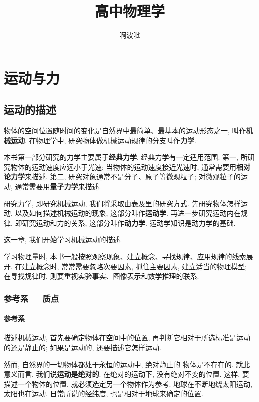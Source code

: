 \documentclass[11pt,a4paper]{ctexbook}
\title{高中物理学}
\author{啊波呲}
\newcommand{\bre}{\ \ \ }
\newcommand{\setdisplaywhitespace}{%
  \setlength{\abovedisplayskip}{4pt plus 2pt minus 1pt}%
  \setlength{\belowdisplayskip}{4pt plus 2pt minus 1pt}%
  \setlength{\abovedisplayshortskip}{2pt plus 1pt minus 1pt}%
  \setlength{\belowdisplayshortskip}{3pt plus 1pt minus 1pt}%
  \setlength{\jot}{3pt}%
}
\begin{document}
\setdisplaywhitespace
\maketitle
{}
\tableofcontents

\setdisplaywhitespace

\part{运动与力}

\chapter{运动的描述}
物体的空间位置随时间的变化是自然界中最简单、最基本的运动形态之一, 叫作\textbf{机械运动}.
在物理学中, 研究物体做机械运动规律的分支叫作\textbf{力学}.

本书第一部分研究的力学主要属于\textbf{经典力学}. 经典力学有一定适用范围.
第一, 所研究物体的运动速度应远小于光速; 当物体的运动速度接近光速时, 通常需要用\textbf{相对论力学}来描述.
第二, 研究对象通常不是分子、原子等微观粒子; 对微观粒子的运动, 通常需要用\textbf{量子力学}来描述.

研究力学, 即研究机械运动, 我们将采取由表及里的研究方式.
先研究物体怎样运动, 以及如何描述机械运动的现象, 这部分叫作\textbf{运动学}.
再进一步研究运动内在规律, 即研究运动和力的关系, 这部分叫作\textbf{动力学}.
运动学知识是动力学的基础.

这一章, 我们开始学习机械运动的描述.

学习物理量时, 本书一般按照观察现象、建立概念、寻找规律、应用规律的线索展开. 在建立概念时, 常常需要忽略次要因素, 抓住主要因素, 建立适当的物理模型; 在寻找规律时, 则要重视实验事实、图像表示和数学推理的联系.

\section{参考系\bre 质点}

\subsection{参考系}

描述机械运动, 首先要确定物体在空间中的位置, 再判断它相对于所选标准是运动的还是静止的;
如果是运动的, 还要描述它怎样运动.

然而, 自然界的一切物体都处于永恒的运动中, 绝对静止的
物体是不存在的. 就此意义而言, 我们说\textbf{运动是绝对的}.
在绝对的运动下, 没有绝对不变的位置. 这样, 要描述一个物体的位置,
就必须选定另一个物体作为参考. 地球在不断地绕太阳运动, 太阳也在运动.
日常所说的经纬度, 也是相对于地球来确定的位置.
\end{document}
